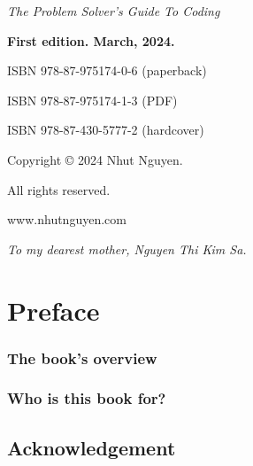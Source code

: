 

\usepackage[paperwidth=17cm,paperheight=22cm]{geometry}
\usepackage[paperwidth=7.5in,paperheight=9.25in]{geometry}


\date{March, 2024}
% 
\frontmatter


\textit{The Problem Solver's Guide To Coding} 

\textbf{First edition. March, 2024.} 

ISBN 978-87-975174-0-6 (paperback)

ISBN 978-87-975174-1-3 (PDF)

ISBN 978-87-430-5777-2 (hardcover)


Copyright © 2024 Nhut Nguyen.

All rights reserved.

www.nhutnguyen.com

\newpage
\begin{center}
    \textit{To my dearest mother, Nguyen Thi Kim Sa.}
\end{center}

\sphinxstepscope



\chapter*{Preface}

\subsection*{The book’s overview}

\subsection*{Who is this book for?}

\section*{Acknowledgement}

